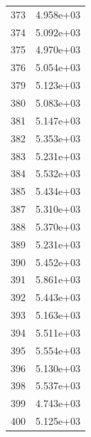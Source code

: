 \documentclass[12pt]{article}
\begin{document}
\begin{longtable}{@{}cc@{}}
373 & 4.958e+03 \\
374 & 5.092e+03 \\
375 & 4.970e+03 \\
376 & 5.054e+03 \\
379 & 5.123e+03 \\
380 & 5.083e+03 \\
381 & 5.147e+03 \\
382 & 5.353e+03 \\
383 & 5.231e+03 \\
384 & 5.532e+03 \\
385 & 5.434e+03 \\
387 & 5.310e+03 \\
388 & 5.370e+03 \\
389 & 5.231e+03 \\
390 & 5.452e+03 \\
391 & 5.861e+03 \\
392 & 5.443e+03 \\
393 & 5.163e+03 \\
394 & 5.511e+03 \\
395 & 5.554e+03 \\
396 & 5.130e+03 \\
398 & 5.537e+03 \\
399 & 4.743e+03 \\
400 & 5.125e+03 \\

\bottomrule
\end{longtable}
\end{document}
